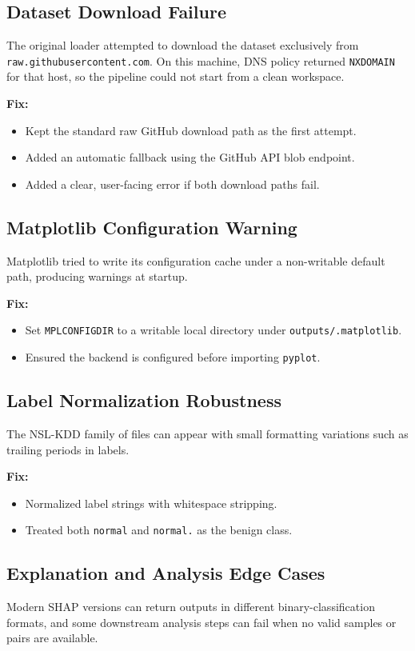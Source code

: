 \documentclass[11pt]{article}
\begin{document}
\subsection{Dataset Download Failure}
The original loader attempted to download the dataset exclusively from \texttt{raw.githubusercontent.com}. On this machine, DNS policy returned \texttt{NXDOMAIN} for that host, so the pipeline could not start from a clean workspace.

\textbf{Fix:}
\begin{itemize}[leftmargin=*]
    \item Kept the standard raw GitHub download path as the first attempt.
    \item Added an automatic fallback using the GitHub API blob endpoint.
    \item Added a clear, user-facing error if both download paths fail.
\end{itemize}

\subsection{Matplotlib Configuration Warning}
Matplotlib tried to write its configuration cache under a non-writable default path, producing warnings at startup.

\textbf{Fix:}
\begin{itemize}[leftmargin=*]
    \item Set \texttt{MPLCONFIGDIR} to a writable local directory under \texttt{outputs/.matplotlib}.
    \item Ensured the backend is configured before importing \texttt{pyplot}.
\end{itemize}

\subsection{Label Normalization Robustness}
The NSL-KDD family of files can appear with small formatting variations such as trailing periods in labels.

\textbf{Fix:}
\begin{itemize}[leftmargin=*]
    \item Normalized label strings with whitespace stripping.
    \item Treated both \texttt{normal} and \texttt{normal.} as the benign class.
\end{itemize}

\subsection{Explanation and Analysis Edge Cases}
Modern SHAP versions can return outputs in different binary-classification formats, and some downstream analysis steps can fail when no valid samples or pairs are available.
\end{document}
